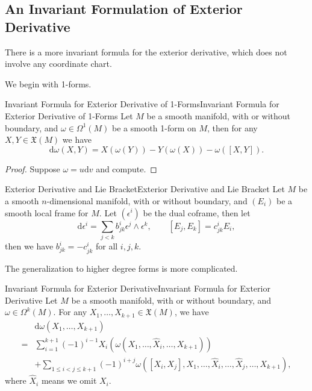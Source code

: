 \documentclass[../main.tex]{subfiles}
\begin{document}
\subsection{An Invariant Formulation of Exterior Derivative}
There is a more invariant formula for the exterior derivative, which does not involve any coordinate chart.

We begin with 1-forms.
\begin{proposition}{Invariant Formula for Exterior Derivative of 1-Forms}{Invariant Formula for Exterior Derivative of 1-Forms}
  Let $M$ be a smooth manifold, with or without boundary, and $\omega \in \Omega^1(M)$ be a smooth 1-form on $M$, then for any $X, Y \in \mathfrak{X}(M)$ we have
  \begin{equation*}
    \mathrm{d} \omega(X, Y) = X(\omega(Y)) - Y(\omega(X)) - \omega([X, Y]).
  \end{equation*}
\end{proposition}
\begin{proof}
  Suppose $\omega = u \mathrm{d} v$ and compute.
\end{proof}

\begin{proposition}{Exterior Derivative and Lie Bracket}{Exterior Derivative and Lie Bracket}
  Let $M$ be a smooth $n$-dimensional manifold, with or without boundary, and $(E_i)$ be a smooth local frame for $M$. Let $(\epsilon^i)$ be the dual coframe, then let
  \begin{equation}
    \mathrm{d} \epsilon^i = \sum_{j<k} b_{jk}^i \epsilon^j \wedge \epsilon^k, \qquad [E_j, E_k] = c_{jk}^i E_i,
  \end{equation}
  then we have $b_{jk}^i = -c_{jk}^i$ for all $i, j, k$.
\end{proposition}

The generalization to higher degree forms is more complicated.
\begin{proposition}{Invariant Formula for Exterior Derivative}{Invariant Formula for Exterior Derivative}
  Let $M$ be a smooth manifold, with or without boundary, and $\omega \in \Omega^k(M)$. For any $X_1, \dots, X_{k+1} \in \mathfrak{X}(M)$, we have
  \begin{equation}
    \begin{aligned}
      & \mathrm{d} \omega(X_1, \dots, X_{k+1}) \\
      = & \sum_{i=1}^{k+1} (-1)^{i-1} X_i(\omega(X_1, \dots, \hat{X}_i, \dots, X_{k+1})) \\
      & + \sum_{1 \leq i < j \leq k+1} (-1)^{i+j} \omega([X_i, X_j], X_1, \dots, \hat{X}_i, \dots, \hat{X}_j, \dots, X_{k+1}),
    \end{aligned}
  \end{equation}
  where $\hat{X}_i$ means we omit $X_i$.
\end{proposition}
\end{document}
